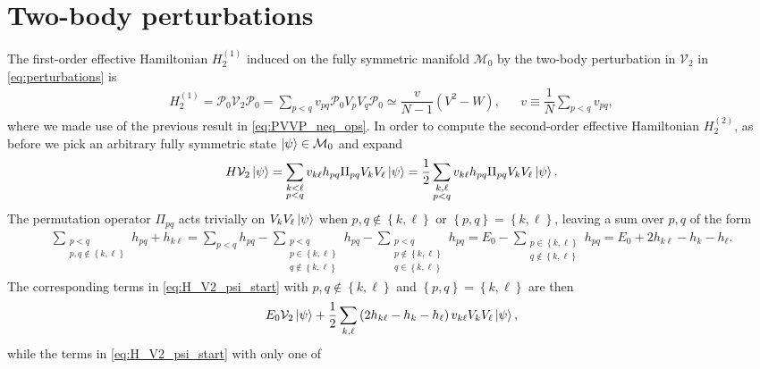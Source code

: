 \documentclass[nofootinbib,notitlepage,11pt]{revtex4-2}
\newcommand{\f}[2]{\dfrac{#1}{#2}} %
\newcommand{\p}[1]{\left(#1\right)} %
\renewcommand{\set}[1]{\left\{#1\right\}} %
\newcommand{\1}{\mathds{1}}
\newcommand{\M}{\mathcal{M}}
\renewcommand{\P}{\mathcal{P}}
\newcommand{\V}{\mathcal{V}}
\begin{document}
\section{Two-body perturbations}

The first-order effective Hamiltonian $H_2^{(1)}$ induced on the fully
symmetric manifold $\M_0$ by the two-body perturbation in $\V_2$ in
\eqref{eq:perturbations} is
\begin{align}
  H_2^{(1)}
  = \P_0 \V_2 \P_0
  = \sum_{p<q} v_{pq} \P_0 V_p V_q \P_0
  \simeq \f{v}{N-1} \p{V^2 - W},
  &&
  v \equiv \f1N \sum_{p<q} v_{pq},
\end{align}
where we made use of the previous result in \eqref{eq:PVVP_neq_ops}.
In order to compute the second-order effective Hamiltonian
$H_2^{(2)}$, as before we pick an arbitrary fully symmetric state
$\ket\psi\in\M_0$ and expand
\begin{align}
  H \V_2 \ket\psi
  = \sum_{\substack{k<\ell\\p<q}} v_{k\ell} h_{pq}
  \Pi_{pq} V_k V_\ell \ket\psi
  = \f12 \sum_{\substack{k,\ell\\p<q}} v_{k\ell} h_{pq}
  \Pi_{pq} V_k V_\ell \ket\psi.
  \label{eq:H_V2_psi_start}
\end{align}
The permutation operator $\Pi_{pq}$ acts trivially on
$V_k V_\ell \ket\psi$ when $p,q\notin\set{k,\ell}$ or
$\set{p,q}=\set{k,\ell}$, leaving a sum over $p,q$ of the form
\begin{align}
  \sum_{\substack{p<q\\p,q\notin\set{k,\ell}}} h_{pq} + h_{k\ell}
  = \sum_{p<q} h_{pq}
  - \sum_{\substack{p<q\\p\in\set{k,\ell}\\q\notin\set{k,\ell}}} h_{pq}
  - \sum_{\substack{p<q\\p\notin\set{k,\ell}\\q\in\set{k,\ell}}} h_{pq}
  = E_0 - \sum_{\substack{p\in\set{k,\ell}\\q\notin\set{k,\ell}}} h_{pq}
  = E_0 + 2 h_{k\ell} - h_k - h_\ell.
\end{align}
The corresponding terms in \eqref{eq:H_V2_psi_start} with
$p,q\notin\set{k,\ell}$ and $\set{p,q}=\set{k,\ell}$ are then
\begin{align}
  E_0 \V_2 \ket\psi + \f12 \sum_{k,\ell}
  \p{2 h_{k\ell} - h_k - h_\ell} v_{k\ell} V_k V_\ell \ket\psi,
\end{align}
while the terms in \eqref{eq:H_V2_psi_start} with only one of
\end{document}
